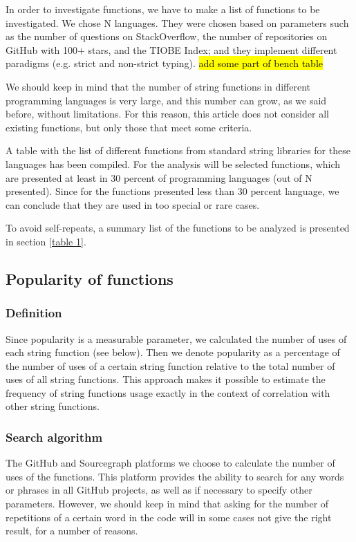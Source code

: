 \documentclass[anonymous,sigplan,review,11pt,nonacm,natbib=false]{acmart}
\begin{document}
    In order to investigate functions, we have to make a list of functions to be investigated. We chose N languages. They were chosen based on parameters such as the number of questions on StackOverflow, the number of repositories on GitHub with 100+ stars, and the TIOBE Index; and they implement different paradigms (e.g. strict and non-strict typing). \hl{add some part of bench table}

    We should keep in mind that the number of string functions in different programming languages is very large, and this number can grow, as we said before, without limitations. For this reason, this article does not consider all existing functions, but only those that meet some criteria.

    A table with the list of different functions from standard string libraries for these languages has been compiled. For the analysis will be selected functions, which are presented at least in 30 percent of programming languages (out of N presented). Since for the functions presented less than 30 percent language, we can conclude that they are used in too special or rare cases.

    To avoid self-repeats, a summary list of the functions to be analyzed is presented in section \ref{table 1}.

    \subsection{Popularity of functions}

    \subsubsection{Definition}

    Since popularity is a measurable parameter, we calculated the number of uses of each string function (see below). Then we denote popularity as a percentage of the number of uses of a certain string function relative to the total number of uses of all string functions. This approach makes it possible to estimate the frequency of string functions usage exactly in the context of correlation with other string functions.

    \subsubsection{Search algorithm}

    The GitHub and Sourcegraph platforms we choose to calculate the number of uses of the functions. This platform provides the ability to search for any words or phrases in all GitHub projects, as well as if necessary to specify other parameters. However, we should keep in mind that asking for the number of repetitions of a certain word in the code will in some cases not give the right result, for a number of reasons.
\end{document}
